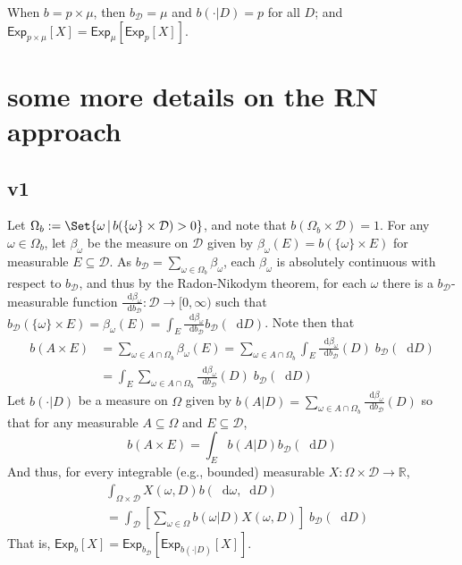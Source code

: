 \documentclass[a4paper]{article}
\newcommand\Exp{\mathsf{Exp}}
\newcommand{\Decs}{\mathcal{D}}
\renewcommand{\Re}{\mathbb{R}}
\renewcommand{\color}[1]{}
\newenvironment{colored}[1]{\leavevmode\color{#1}}{}
\newcommand\SetDelimiter[1][]{
	\nonscript\,#1\vert \allowbreak \nonscript\,\mathopen{}}
\providecommand\given{\SetDelimiter}
\newcommand*\diff{\mathop{}\!\mathrm{d}}
\newenvironment{CCM rewritten}
{\begingroup\color{blue}} %
{\endgroup}              %
\begin{document}
\begin{colored}{violet}
When $b=p\times\mu$, then $b_\Decs=\mu$ and $b(\cdot|D)=p$ for all $D$; and $\Exp_{p\times\mu}[X]=\Exp_{\mu}[\Exp_{p}[X]]$.





\begin{colored}{red}
	\section{some more details on the RN approach}
	
	\subsection{v1}
Let $\Omega_b:=\Set{\omega\given b(\{\omega\}\times\Decs)>0}$, and note that $b(\Omega_b\times\Decs)=1$. For any $\omega\in \Omega_b$, let $\beta_\omega$ be the measure on $\Decs$ given by $\beta_\omega(E)=b(\{\omega\}\times E)$ for measurable $E\subseteq \Decs$. 
As $b_\Decs=\sum_{\omega\in\Omega_b}\beta_\omega$, each $\beta_\omega$ is absolutely continuous with respect to $b_\Decs$, and thus by the Radon-Nikodym theorem, for each $\omega$ there is a $b_\Decs$-measurable function $\frac{\diff \beta_\omega}{\diff b_\Decs}:\Decs\to[0,\infty)$ such that $b_\Decs(\{\omega\}\times E)=\beta_\omega(E)=\int_E \frac{\diff \beta_\omega}{\diff b_\Decs}b_\Decs(\diff D)$.
Note then that \begin{align}
	b(A\times E)&=\sum_{\omega\in A\cap \Omega_b}\beta_\omega(E)=\sum_{\omega\in A\cap \Omega_b}\int_E \frac{\diff \beta_\omega}{\diff b_\Decs}(D)\;b_\Decs(\diff D)\\
	&=\int_E\sum_{\omega\in A\cap \Omega_b} \frac{\diff \beta_\omega}{\diff b_\Decs}(D)\;b_\Decs(\diff D)
\end{align}
Let $b(\cdot|D)$ be a measure on $\Omega$ given by $b(A|D)=\sum_{\omega\in A\cap \Omega_b} \frac{\diff \beta_\omega}{\diff b_\Decs}(D)$ so that for any measurable $A\subseteq\Omega$ and $E\subseteq\Decs$, 
\[
b(A\times E)=\int_E b(A|D) b_\Decs(\diff D)
\]
And thus,  for every integrable (e.g., bounded) measurable $X:\Omega\times\Decs\to\Re$, \begin{align}
	&\int_{\Omega\times \Decs} X(\omega,D) b(\diff \omega, \diff D)\\
	&=\int_\Decs \left[\sum_{\omega\in\Omega} b(\omega|D)X(\omega,D)\right]\;b_\Decs(\diff D)
\end{align}
That is, $\Exp_b[X]=\Exp_{b_\Decs}[\Exp_{b(\cdot|D)}[X]]$.


\end{colored}
\end{colored}
\end{document}
